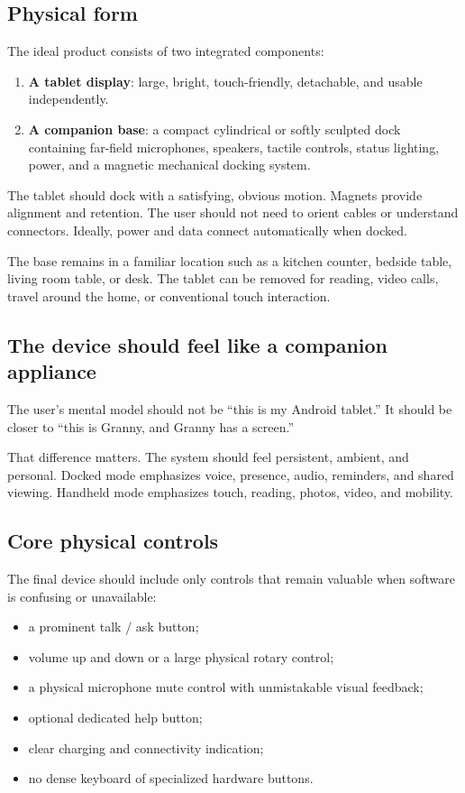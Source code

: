 \documentclass[11pt]{article}
\begin{document}
\subsection{Physical form}
The ideal product consists of two integrated components:

\begin{enumerate}[leftmargin=*]
    \item \textbf{A tablet display}: large, bright, touch-friendly, detachable, and usable independently.
    \item \textbf{A companion base}: a compact cylindrical or softly sculpted dock containing far-field microphones, speakers, tactile controls, status lighting, power, and a magnetic mechanical docking system.
\end{enumerate}

The tablet should dock with a satisfying, obvious motion. Magnets provide alignment and retention. The user should not need to orient cables or understand connectors. Ideally, power and data connect automatically when docked.

The base remains in a familiar location such as a kitchen counter, bedside table, living room table, or desk. The tablet can be removed for reading, video calls, travel around the home, or conventional touch interaction.

\subsection{The device should feel like a companion appliance}
The user's mental model should not be ``this is my Android tablet.'' It should be closer to ``this is Granny, and Granny has a screen.''

That difference matters. The system should feel persistent, ambient, and personal. Docked mode emphasizes voice, presence, audio, reminders, and shared viewing. Handheld mode emphasizes touch, reading, photos, video, and mobility.

\subsection{Core physical controls}
The final device should include only controls that remain valuable when software is confusing or unavailable:

\begin{itemize}[leftmargin=*]
    \item a prominent talk / ask button;
    \item volume up and down or a large physical rotary control;
    \item a physical microphone mute control with unmistakable visual feedback;
    \item optional dedicated help button;
    \item clear charging and connectivity indication;
    \item no dense keyboard of specialized hardware buttons.
\end{itemize}
\end{document}
